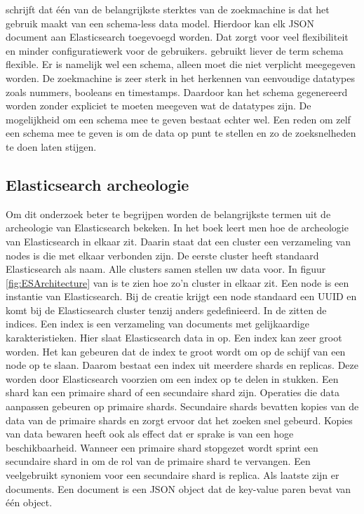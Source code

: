 \textcite{Glauner2012} schrijft dat één van de belangrijkste sterktes van de zoekmachine is dat het gebruik maakt van een schema-less data model. Hierdoor kan elk JSON document aan Elasticsearch toegevoegd worden. Dat zorgt voor veel flexibiliteit en minder configuratiewerk voor de gebruikers. \textcite{Brasetvik2013} gebruikt liever de term schema flexible. Er is namelijk wel een schema, alleen moet die niet verplicht meegegeven worden. De zoekmachine is zeer sterk in het herkennen van eenvoudige datatypes zoals nummers, booleans en timestamps. Daardoor kan het schema gegenereerd worden zonder expliciet te moeten meegeven wat de datatypes zijn. De mogelijkheid om een schema mee te geven bestaat echter wel. Een reden om zelf een schema mee te geven is om de data op punt te stellen en zo de zoeksnelheden te doen laten stijgen.

\subsection{Elasticsearch archeologie}

Om dit onderzoek beter te begrijpen worden de belangrijkste termen uit de archeologie van Elasticsearch bekeken. In het boek \textcite{Dixit2016} leert men hoe de archeologie van Elasticsearch in elkaar zit. Daarin staat dat een cluster een verzameling van nodes is die met elkaar verbonden zijn. De eerste cluster heeft standaard Elasticsearch als naam. Alle clusters samen stellen uw data voor. In figuur \ref{fig:ESArchitecture} van \textcite{Babaev2013} is te zien hoe zo'n cluster in elkaar zit. Een node is een instantie van Elasticsearch. Bij de creatie krijgt een node standaard een UUID en komt bij de Elasticsearch cluster tenzij anders gedefinieerd. In de zitten de indices. Een index is een verzameling van documents met gelijkaardige karakteristieken. Hier slaat Elasticsearch data in op. Een index kan zeer groot worden. Het kan gebeuren dat de index te groot wordt om op de schijf van een node op te slaan. Daarom bestaat een index uit meerdere shards en replicas. Deze worden door Elasticsearch voorzien om een index op te delen in stukken. Een shard kan een primaire shard of een secundaire shard zijn. Operaties die data aanpassen gebeuren op primaire shards. Secundaire shards bevatten kopies van de data van de primaire shards en zorgt ervoor dat het zoeken snel gebeurd. Kopies van data bewaren heeft ook als effect dat er sprake is van een hoge beschikbaarheid. Wanneer een primaire shard stopgezet wordt sprint een secundaire shard in om de rol van de primaire shard te vervangen. Een veelgebruikt synoniem voor een secundaire shard is replica. Als laatste zijn er documents. Een document is een JSON object dat de key-value paren bevat van één object.


